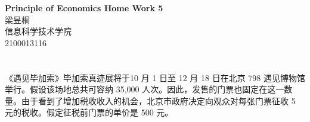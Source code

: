\documentclass[11pt,a4paper,fleqn]{article}
\newcommand{\hwid}{5}
\newcommand{\name}{梁昱桐}
\newcommand{\institute}{信息科学技术学院}
\newcommand{\id}{2100013116}
\begin{document}
\pagestyle{fancy}
\chead{}

\setlength{\parindent}{0pt}

\begin{center}
	{\LARGE \bf Principle of Economics Home Work \hwid}\\
	{\Large \name}\\
	{\Large \institute}\\
	{\Large \id}\\
\end{center}

\section{}
《遇见毕加索》毕加索真迹展将于10 月 1 日至 12 月 18 日在北京 798 遇见博物馆举行。假设该场地总共可容纳 35,000 人次。因此，发售的门票也固定在这一数量。由于看到了增加税收收入的机会，北京市政府决定向观众对每张门票征收 5 元的税收。假定征税前门票的单价是 500 元。
\end{document}
